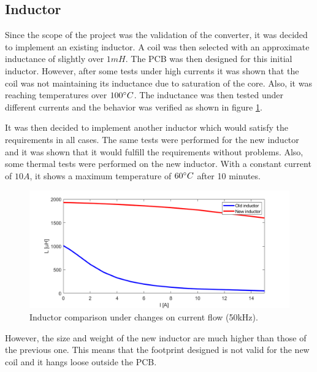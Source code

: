 \subsection{Inductor}
\label{Coil problems}
Since the scope of the project was the validation of the converter, it was decided to implement an existing inductor. A coil was then selected with an approximate inductance of slightly over $1mH$.
The PCB was then designed for this initial inductor. However, after some  tests under high currents it was shown that the coil was not maintaining its inductance due to saturation of the core. Also, it was reaching temperatures over $100\dec C$. The inductance was then tested under different currents and the behavior was verified as shown in figure \ref{Coil comparison}.

It was then decided to implement another inductor which would satisfy the requirements in all cases. The same tests were performed for the new inductor and it was shown that it would fulfill the requirements without problems. 
Also, some thermal tests were performed on the new inductor. With a constant current of $10A$, it shows a maximum temperature of $60\dec C$ after 10 minutes.

\begin{figure}[H]
	\begin{center}
		\includegraphics[width=1\textwidth]{docs/discussion/CoilTests/CoilComparison50kHzV2.png}
		\caption{Inductor comparison under changes on current flow (50kHz).}
		\label{Coil comparison}
	\end{center}	
\end{figure}

However, the size and weight of the new inductor are much higher than those of the previous one. This means that the footprint designed is not valid for the new coil and it hangs loose outside the PCB.

